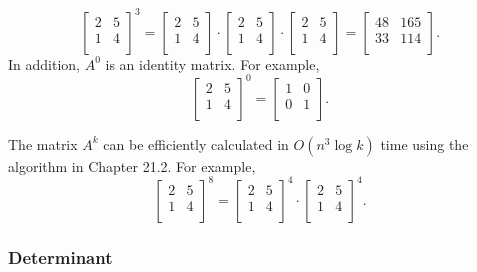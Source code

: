 \[
 \begin{bmatrix}
  2 & 5 \\
  1 & 4 \\
 \end{bmatrix}^3 =
 \begin{bmatrix}
  2 & 5 \\
  1 & 4 \\
 \end{bmatrix} \cdot
 \begin{bmatrix}
  2 & 5 \\
  1 & 4 \\
 \end{bmatrix} \cdot
 \begin{bmatrix}
  2 & 5 \\
  1 & 4 \\
 \end{bmatrix} =
 \begin{bmatrix}
  48 & 165 \\
  33 & 114 \\
 \end{bmatrix}.
\]
In addition, $A^0$ is an identity matrix. For example,
\[
 \begin{bmatrix}
  2 & 5 \\
  1 & 4 \\
 \end{bmatrix}^0 =
 \begin{bmatrix}
  1 & 0 \\
  0 & 1 \\
 \end{bmatrix}.
\]

The matrix $A^k$ can be efficiently calculated
in $O(n^3 \log k)$ time using the
algorithm in Chapter 21.2. For example,
\[
 \begin{bmatrix}
  2 & 5 \\
  1 & 4 \\
 \end{bmatrix}^8 =
 \begin{bmatrix}
  2 & 5 \\
  1 & 4 \\
 \end{bmatrix}^4 \cdot
 \begin{bmatrix}
  2 & 5 \\
  1 & 4 \\
 \end{bmatrix}^4.
\]

\subsubsection{Determinant}

